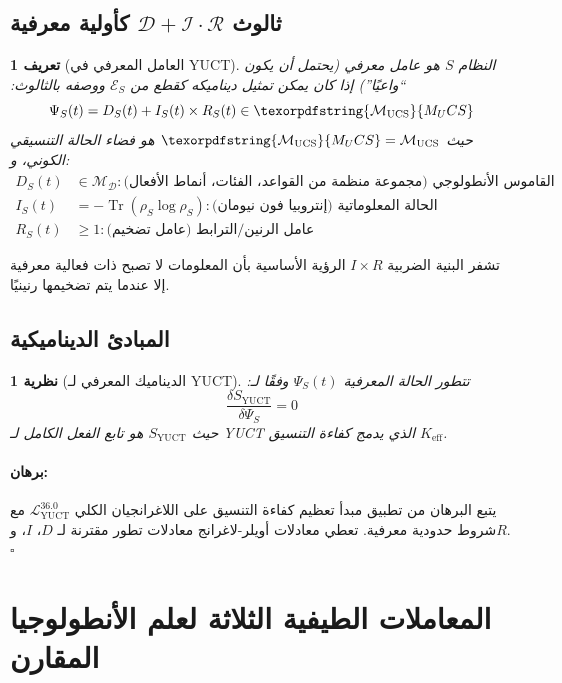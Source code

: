 \documentclass[12pt,a4paper]{article}
\newtheorem{theorem}{نظرية}
\newtheorem{definition}{تعريف}
\renewenvironment{proof}{\paragraph{برهان:}}{\hfill$\square$}
\DeclareMathOperator{\Tr}{Tr}
\DeclareRobustCommand{\UCS}{\texorpdfstring{\ensuremath{\mathcal{M}_{\mathrm{UCS}}}}{M_UCS}}
\newcommand{\eff}{\mathrm{eff}}
\newcommand{\Dict}{\mathcal{D}}
\newcommand{\Mdict}{\mathcal{M}_{\Dict}}
\newcommand{\Ke}{K_{\eff}}
\begin{document}
	\subsection{ثالوث \(\mathcal{D}+\mathcal{I}\cdot\mathcal{R}\) كأولية معرفية}
	
	\begin{definition}[العامل المعرفي في YUCT]
		النظام \(S\) هو عامل معرفي (يحتمل أن يكون ``واعيًا'') إذا كان يمكن تمثيل ديناميكه كقطع من \(\mathcal{E}_S\) ووصفه بالثالوث:
		\begin{equation}
			\label{eq:dir-triad}
			\Psi_S(t) = D_S(t) + I_S(t) \times R_S(t) \in \UCS
		\end{equation}
		حيث \(\UCS = \mathcal{M}_{\mathrm{UCS}}\) هو فضاء الحالة التنسيقي الكوني، و:
		\begin{align*}
			D_S(t) &\in \Mdict: \text{القاموس الأنطولوجي (مجموعة منظمة من القواعد، الفئات، أنماط الأفعال)} \\
			I_S(t) &= -\Tr(\rho_S \log \rho_S): \text{الحالة المعلوماتية (إنتروبيا فون نيومان)} \\
			R_S(t) &\geq 1: \text{عامل الرنين/الترابط (عامل تضخيم)}
		\end{align*}
	\end{definition}
	
	تشفر البنية الضربية \(I \times R\) الرؤية الأساسية بأن المعلومات لا تصبح ذات فعالية معرفية إلا عندما يتم تضخيمها رنينيًا.
	
	\subsection{المبادئ الديناميكية}
	
	\begin{theorem}[الديناميك المعرفي لـ YUCT]
		تتطور الحالة المعرفية \(\Psi_S(t)\) وفقًا لـ:
		\begin{equation}
			\label{eq:cognitive-dynamics}
			\frac{\delta S_{\mathrm{YUCT}}}{\delta \Psi_S} = 0
		\end{equation}
		حيث \(S_{\mathrm{YUCT}}\) هو تابع الفعل الكامل لـ YUCT الذي يدمج كفاءة التنسيق \(\Ke\).
	\end{theorem}
	
	\begin{proof}
		يتبع البرهان من تطبيق مبدأ تعظيم كفاءة التنسيق على اللاغرانجيان الكلي \(\mathcal{L}_{\mathrm{YUCT}}^{36.0}\) مع شروط حدودية معرفية. تعطي معادلات أويلر-لاغرانج معادلات تطور مقترنة لـ \(D\)، \(I\)، و\(R\).
	\end{proof}
	
	\section{المعاملات الطيفية الثلاثة لعلم الأنطولوجيا المقارن}
	
\end{document}
